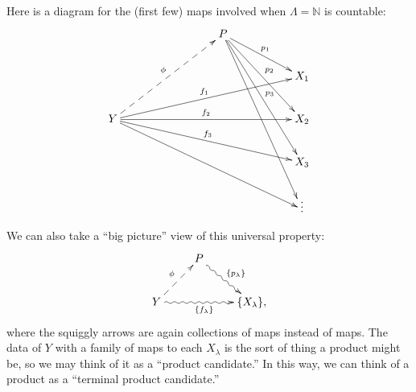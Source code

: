 \documentclass{amsart}[12pt]
\newcommand{\N}{\mathbb{N}}
\numberwithin{equation}{section}
\theoremstyle{plain} %
\theoremstyle{definition}
\theoremstyle{remark}
\begin{document}
Here is a diagram for the (first few) maps involved when $\Lambda=\N$ is countable:
\[\xymatrix{  & & & P \ar[drr]^-{p_1} \ar[ddrr]^-{p_2} \ar[dddrr]^-{p_3} \ar[ddddrr]  & & \\
 & & & & & X_1\\
Y \ar@{-->}[uurrr]^-{\phi}\ar[urrrrr]^-{f_1}  \ar[rrrrr]^-{f_2} \ar[drrrrr]^-{f_3} \ar[ddrrrrr]&  & & & & X_2\\
& & & & & X_3\\
& & & & & \vdots }\]

We can also take a ``big picture'' view of this universal property:
\[\xymatrix{ & P\ar@{~>}[dr]^{\{p_\lambda\}} & \\
Y \ar@{-->}[ur]^{\phi} \ar@{~>}[rr]_{\{f_\lambda\}} & & \{X_{\lambda}\},}\]
where the squiggly arrows are again collections of maps instead of maps. The data of $Y$ with a family of maps to each $X_\lambda$ is the sort of thing a product might be, so we may think of it as a ``product candidate.'' In this way, we can think of a product as a ``terminal product candidate.''
\end{document}
